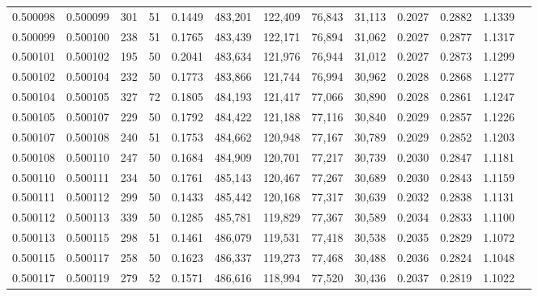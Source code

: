 \begin{tabular}{rrrrrrrrrrrrr}
0.500098 & 0.500099 & 301 &  51 &                                     0.1449 & 483,201 & 122,409 &  76,843 &  31,113 & 0.2027 & 0.2882 & 1.1339 \\
0.500099 & 0.500100 & 238 &  51 &                                     0.1765 & 483,439 & 122,171 &  76,894 &  31,062 & 0.2027 & 0.2877 & 1.1317 \\
0.500101 & 0.500102 & 195 &  50 &                                     0.2041 & 483,634 & 121,976 &  76,944 &  31,012 & 0.2027 & 0.2873 & 1.1299 \\
0.500102 & 0.500104 & 232 &  50 &                                     0.1773 & 483,866 & 121,744 &  76,994 &  30,962 & 0.2028 & 0.2868 & 1.1277 \\
0.500104 & 0.500105 & 327 &  72 &                                     0.1805 & 484,193 & 121,417 &  77,066 &  30,890 & 0.2028 & 0.2861 & 1.1247 \\
0.500105 & 0.500107 & 229 &  50 &                                     0.1792 & 484,422 & 121,188 &  77,116 &  30,840 & 0.2029 & 0.2857 & 1.1226 \\
0.500107 & 0.500108 & 240 &  51 &                                     0.1753 & 484,662 & 120,948 &  77,167 &  30,789 & 0.2029 & 0.2852 & 1.1203 \\
0.500108 & 0.500110 & 247 &  50 &                                     0.1684 & 484,909 & 120,701 &  77,217 &  30,739 & 0.2030 & 0.2847 & 1.1181 \\
0.500110 & 0.500111 & 234 &  50 &                                     0.1761 & 485,143 & 120,467 &  77,267 &  30,689 & 0.2030 & 0.2843 & 1.1159 \\
0.500111 & 0.500112 & 299 &  50 &                                     0.1433 & 485,442 & 120,168 &  77,317 &  30,639 & 0.2032 & 0.2838 & 1.1131 \\
0.500112 & 0.500113 & 339 &  50 &                                     0.1285 & 485,781 & 119,829 &  77,367 &  30,589 & 0.2034 & 0.2833 & 1.1100 \\
0.500113 & 0.500115 & 298 &  51 &                                     0.1461 & 486,079 & 119,531 &  77,418 &  30,538 & 0.2035 & 0.2829 & 1.1072 \\
0.500115 & 0.500117 & 258 &  50 &                                     0.1623 & 486,337 & 119,273 &  77,468 &  30,488 & 0.2036 & 0.2824 & 1.1048 \\
0.500117 & 0.500119 & 279 &  52 &                                     0.1571 & 486,616 & 118,994 &  77,520 &  30,436 & 0.2037 & 0.2819 & 1.1022 \\

\end{tabular}
